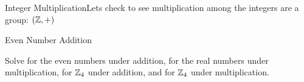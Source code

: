 \begin{example}
    {Integer Multiplication}Lets check to see multiplication among the integers are a group: $(\mathbb{Z}, +)$
\end{example}

\begin{example}
    {Even Number Addition}
\end{example}

Solve for the even numbers under addition, for the real numbers under multiplication, for $\mathbb{Z}_4$ under addition, and for $\mathbb{Z}_4$ under multiplication.